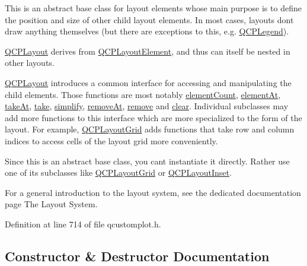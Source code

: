 This is an abstract base class for layout elements whose main purpose is to define the position and size of other child layout elements. In most cases, layouts don\textquotesingle{}t draw anything themselves (but there are exceptions to this, e.\+g. \hyperlink{class_q_c_p_legend}{Q\+C\+P\+Legend}).

\hyperlink{class_q_c_p_layout}{Q\+C\+P\+Layout} derives from \hyperlink{class_q_c_p_layout_element}{Q\+C\+P\+Layout\+Element}, and thus can itself be nested in other layouts.

\hyperlink{class_q_c_p_layout}{Q\+C\+P\+Layout} introduces a common interface for accessing and manipulating the child elements. Those functions are most notably \hyperlink{class_q_c_p_layout_a39d3e9ef5d9b82ab1885ba1cb9597e56}{element\+Count}, \hyperlink{class_q_c_p_layout_afa73ca7d859f8a3ee5c73c9b353d2a56}{element\+At}, \hyperlink{class_q_c_p_layout_a5a79621fa0a6eabb8b520cfc04fb601a}{take\+At}, \hyperlink{class_q_c_p_layout_ada26cd17e56472b0b4d7fbbc96873e4c}{take}, \hyperlink{class_q_c_p_layout_a41e6ac049143866e8f8b4964efab01b2}{simplify}, \hyperlink{class_q_c_p_layout_a2403f684fee3ce47132faaeed00bb066}{remove\+At}, \hyperlink{class_q_c_p_layout_a6c58f537d8086f352576ab7c5b15d0bc}{remove} and \hyperlink{class_q_c_p_layout_a02883bdf2769b5b227f0232dba1ac4ee}{clear}. Individual subclasses may add more functions to this interface which are more specialized to the form of the layout. For example, \hyperlink{class_q_c_p_layout_grid}{Q\+C\+P\+Layout\+Grid} adds functions that take row and column indices to access cells of the layout grid more conveniently.

Since this is an abstract base class, you can\textquotesingle{}t instantiate it directly. Rather use one of its subclasses like \hyperlink{class_q_c_p_layout_grid}{Q\+C\+P\+Layout\+Grid} or \hyperlink{class_q_c_p_layout_inset}{Q\+C\+P\+Layout\+Inset}.

For a general introduction to the layout system, see the dedicated documentation page The Layout System. 

Definition at line 714 of file qcustomplot.\+h.



\subsection{Constructor \& Destructor Documentation}
\mbox{\label{class_q_c_p_layout_a04222e6e1361fd802d48f1a25b7020d4}} 
